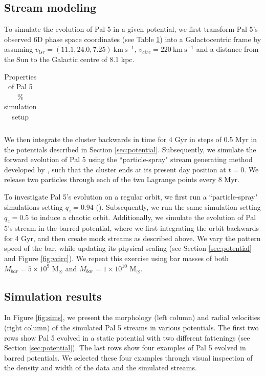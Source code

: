 \documentclass[modern]{aastex62}
\newcommand{\msun}{\textrm{M}_\odot}
\newcommand{\kms}{\ensuremath{\textrm{km}~\textrm{s}^{-1}}}
\begin{document}
\subsection{Stream modeling}
\label{sec:modeling}
To simulate the evolution of Pal 5 in a given potential, we first transform Pal 5's observed 6D phase space coordinates (see Table \ref{tab:Pal5}) into a Galactocentric frame by assuming $v_{lsr} = (11.1, 24.0, 7.25) ~\kms$,  $v_{circ} = 220  ~\kms$ and a distance from the Sun to the Galactic centre of 8.1 kpc. 


\begin{table}
\centering
\caption{Properties of Pal 5 \% simulation setup}
\label{tab:Pal5}
\begin{tabular}{lccc}
\hline
 && &   \\ 
 \hline

\hline 
\end{tabular}
\end{table}



We then integrate the cluster backwards in time for 4 Gyr in steps of 0.5 Myr in the potentials described in Section \ref{sec:potential}. Subsequently, we simulate the forward evolution of Pal 5 using the ``particle-spray" stream generating method developed by \citet{Fardal:2015}, such that the cluster ends at its present day position at $t = 0$. We release two particles through each of the two Lagrange points every 8 Myr. 

To investigate Pal 5's evolution on a regular orbit, we first run a ``particle-spray" simulations setting $q_z = 0.94$ (\citealt{Bovy:2016}). Subsequently, we run the same simulation setting $q_z = 0.5$ to induce a chaotic orbit. Additionally, we simulate the evolution of Pal 5's stream in the barred potential, where we first integrating the orbit backwards for 4 Gyr, and then create mock streams as described above. We vary the pattern speed of the bar, while updating its physical scaling (see Section \ref{sec:potential} and Figure \ref{fig:vcirc}). We repeat this exercise using bar masses of both $M_{bar} = 5 \times 10^{9}$ $\msun$ and $M_{bar} = 1 \times 10^{10}$ $\msun$.

\subsection{Simulation results}
\label{sec:sim_results}
In Figure \ref{fig:sims}, we present the morphology (left column) and radial velocities (right column) of the simulated Pal 5 streams in various potentials. The first two rows show Pal 5 evolved in a static potential with two different fattenings (see Section \ref{sec:potential}). The  last rows show four examples of Pal 5 evolved in barred potentials. We selected these four examples through visual inspection of the density and width of the data and the simulated streams.  
\end{document}
